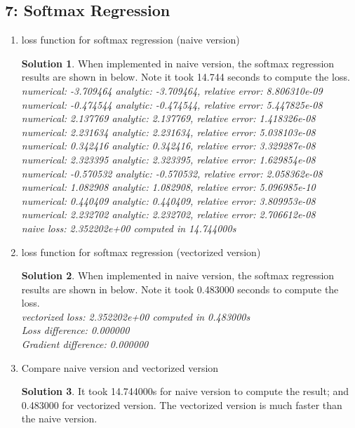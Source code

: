 \documentclass[]{book}
\theoremstyle{definition}
\newtheorem*{soln}{Solution}
\begin{document}
\subsection*{7: Softmax Regression}
\begin{enumerate}
\item loss function for softmax regression (naive version)
\begin{soln}
	When implemented in naive version, the softmax regression results are shown in below. Note it took 14.744 seconds to compute the loss. \\
	\textsl{numerical: -3.709464 analytic: -3.709464, relative error: 8.806310e-09 \\
	numerical: -0.474544 analytic: -0.474544, relative error: 5.447825e-08 \\
	numerical: 2.137769 analytic: 2.137769, relative error: 1.418326e-08 \\
	numerical: 2.231634 analytic: 2.231634, relative error: 5.038103e-08 \\
	numerical: 0.342416 analytic: 0.342416, relative error: 3.329287e-08 \\
	numerical: 2.323395 analytic: 2.323395, relative error: 1.629854e-08 \\
	numerical: -0.570532 analytic: -0.570532, relative error: 2.058362e-08 \\
	numerical: 1.082908 analytic: 1.082908, relative error: 5.096985e-10 \\
	numerical: 0.440409 analytic: 0.440409, relative error: 3.809953e-08 \\
	numerical: 2.232702 analytic: 2.232702, relative error: 2.706612e-08 \\
	naive loss: 2.352202e+00 computed in 14.744000s}
\end{soln}
\item loss function for softmax regression (vectorized version)
\begin{soln}
	When implemented in naive version, the softmax regression results are shown in below. Note it took 0.483000 seconds to compute the loss. \\
	\textsl{
	vectorized loss: 2.352202e+00 computed in 0.483000s \\
	Loss difference: 0.000000 \\
	Gradient difference: 0.000000}
\end{soln}
\item Compare naive version and vectorized version

\begin{soln}
	It took 14.744000s for naive version to compute the result; and 0.483000 for vectorized version. The vectorized version is much faster than the naive version.
\end{soln}


\end{enumerate}
\end{document}
